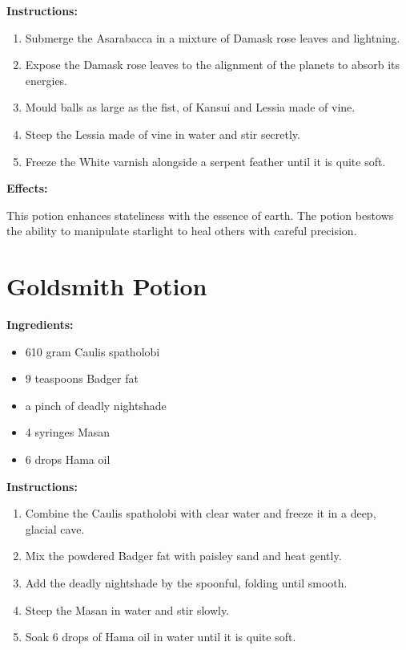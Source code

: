 \documentclass{article}
\begin{document}
\textbf{Instructions:}

\begin{enumerate}
  \item Submerge the Asarabacca in a mixture of Damask rose leaves and lightning.
  \item Expose the Damask rose leaves to the alignment of the planets to absorb its energies.
  \item Mould balls as large as the fist, of Kansui and Lessia made of vine.
  \item Steep the Lessia made of vine in water and stir secretly.
  \item Freeze the White varnish alongside a serpent feather until it is quite soft.
\end{enumerate}

\textbf{Effects:}

This potion enhances stateliness with the essence of earth. The potion bestows the ability to manipulate starlight to heal others with careful precision.

\newpage
\section*{Goldsmith Potion}

\textbf{Ingredients:}

\begin{itemize}
  \item 610 gram Caulis spatholobi
  \item 9 teaspoons Badger fat
  \item a pinch of deadly nightshade
  \item 4 syringes Masan
  \item 6 drops Hama oil
\end{itemize}

\textbf{Instructions:}

\begin{enumerate}
  \item Combine the Caulis spatholobi with clear water and freeze it in a deep, glacial cave.
  \item Mix the powdered Badger fat with paisley sand and heat gently.
  \item Add the deadly nightshade by the spoonful, folding until smooth.
  \item Steep the Masan in water and stir slowly.
  \item Soak 6 drops of Hama oil in water until it is quite soft.
\end{enumerate}
\end{document}
